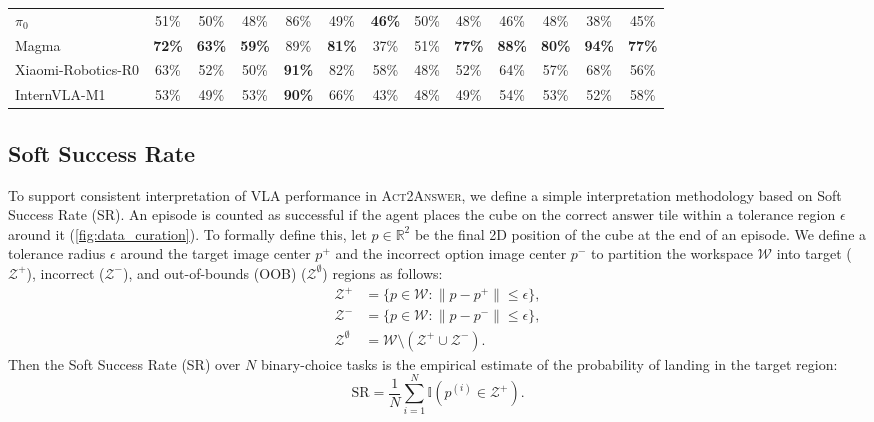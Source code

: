 \documentclass[11pt]{article}
\newcommand{\heatDG}[1]{\cellcolor{mydarkgreen}\textbf{#1}}
\newcommand{\heatG}[1]{\cellcolor{mygreen}#1}
\newcommand{\heatLG}[1]{\cellcolor{mylightgreen}#1}
\newcommand{\heatO}[1]{\cellcolor{myorange}#1}
\newcommand{\heatR}[1]{\cellcolor{myred}#1}
\begin{document}
\begin{table}[t]
{\begin{tabular}{lcccccccccccc}
$\pi_0$
& \heatO{51\%} & \heatO{50\%} & \heatO{48\%} & \heatG{86\%} & \heatO{49\%} & \heatO{\textbf{46\%}} & \heatO{50\%} & \heatO{48\%} & \heatO{46\%} & \heatO{48\%} & \heatR{38\%} & \heatR{45\%} \\

Magma
& \heatG{\textbf{72\%}} & \heatG{\textbf{63\%}} & \heatLG{\textbf{59\%}} & \heatG{89\%} & \heatG{\textbf{81\%}} & \heatR{37\%} & \heatO{51\%} & \heatG{\textbf{77\%}} & \heatG{\textbf{88\%}} & \heatG{\textbf{80\%}} & \heatDG{\textbf{94\%}} & \heatG{\textbf{77\%}} \\

Xiaomi-Robotics-R0
& \heatG{63\%}
& \heatO{52\%}
& \heatO{50\%}
& \heatDG{91\%}
& \heatG{82\%}
& \heatLG{58\%}
& \heatO{48\%}
& \heatO{52\%}
& \heatG{64\%}
& \heatLG{57\%}
& \heatG{68\%}
& \heatLG{56\%} \\

InternVLA-M1
& \heatO{53\%} & \heatO{49\%} & \heatO{53\%} & \heatDG{90\%} & \heatG{66\%} & \heatR{43\%} & \heatO{48\%} & \heatO{49\%} & \heatLG{54\%} & \heatO{53\%} & \heatO{52\%} & \heatLG{58\%} \\

\bottomrule
\end{tabular}%
}
\end{table}



\subsection{Soft Success Rate}
\label{subsec:soft_success_rate}

To support consistent interpretation of VLA performance in \textsc{Act2Answer}, we define a simple interpretation methodology based on Soft Success Rate (SR). An episode is counted as successful if the agent places the cube on the correct answer tile within a tolerance region $\epsilon$ around it (\autoref{fig:data_curation}). To formally define this, let $p \in \mathbb{R}^2$ be the final 2D position of the cube at the end of an episode. We define a tolerance radius $\epsilon$ around the target image center $p^+$ and the incorrect option image center $p^-$ to partition the workspace $\mathcal{W}$ into target ($\mathcal{Z}^{+}$), incorrect ($\mathcal{Z}^{-}$), and
out-of-bounds (OOB) ($\mathcal{Z}^{\emptyset}$) regions as follows:
\begin{align}
\mathcal{Z}^+ &= \{p \in \mathcal{W} : \|p - p^+\| \le \epsilon\}, \\
\mathcal{Z}^- &= \{p \in \mathcal{W} : \|p - p^-\| \le \epsilon\}, \\
\mathcal{Z}^{\emptyset} &= \mathcal{W} \setminus (\mathcal{Z}^+ \cup \mathcal{Z}^-).
\end{align}
Then the Soft Success Rate (SR) over $N$ binary-choice tasks is the empirical estimate of the probability of landing in the target region:
\begin{equation}
\mathrm{SR} = \frac{1}{N}\sum_{i=1}^{N} \mathbb{I}\!\left(p^{(i)} \in \mathcal{Z}^+\right).
\end{equation}
\end{document}
